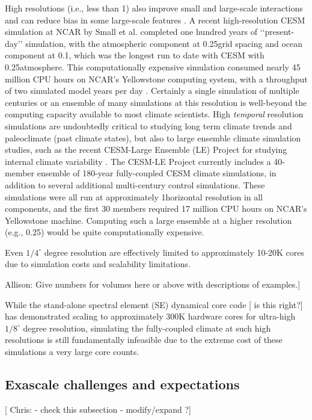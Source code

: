  High resolutions (i.e., less than 1\degree)  also improve small and large-scale interactions and can reduce bias in some large-scale features \cite{small2014}.  A recent high-resolution CESM simulation at NCAR by Small et al. \cite{small2014} completed one hundred years of ‘‘present-day’’ simulation, with the atmospheric component at 0.25\degree grid spacing and ocean component at 0.1\degree, which was the longest run to date with CESM with 0.25\degree atmosphere.  This computationally expensive simulation consumed nearly 45 million CPU hours on NCAR's Yellowstone computing system, with a throughput of two simulated model years per day \cite{small2014}. Certainly a single simulation of multiple centuries or an ensemble of many simulations at this resolution is well-beyond the computing capacity available to most climate scientists.  High \textit{temporal} resolution simulations are undoubtedly critical to studying long term climate trends and paleoclimate (past climate states), but also to large ensemble climate simulation studies, such as the recent CESM-Large Ensemble (LE) Project for studying internal climate variability \citep{kay2015}.  The CESM-LE Project currently includes a 40-member ensemble of 180-year fully-coupled CESM climate simulations, in addition to several additional multi-century control simulations.  These simulations were all run at approximately 1\degree horizontal resolution in all components, and the first 30 members required 17 million CPU hours on NCAR's Yellowstone machine.  Computing such a large ensemble at a higher resolution (e.g., 0.25\degree) would be quite computationally expensive.


 Even $1/4^\circ$ degree resolution are effectively limited to approximately 10-20K cores due to simulation costs and scalability limitations.  


{\color{red} Allison:} Give numbers for volumes here or above with descriptions of examples.]  

While the stand-alone spectral element (SE) dynamical core code [{\color{red} is this right?}] has demonstrated scaling to approximately 300K hardware cores \cite{came} for ultra-high $1/8^\circ$ degree resolution, simulating the fully-coupled climate at such high resolutions is still fundamentally infeasible due to the extreme cost of these simulations a very large core counts. 


\subsection{Exascale challenges and expectations}
[{\color{red} Chris:} - check this subsection - modify/expand ?]

